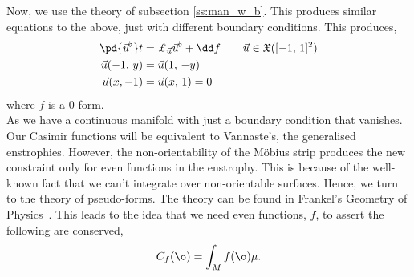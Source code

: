 \noindent
Now, we use the theory of subsection \ref{ss:man_w_b}. This produces similar equations to the above, just with different boundary conditions. This produces,
\begin{equation}
  \begin{split}
    \pd {\vec u^\flat} t &= \pounds_{\vec u} \vec u^\flat + \dd f \qquad \vec u \in \mathfrak{X}([-1,\,1]^2)\\
    \vec u(-1,\,y) &= \vec u(1,\, -y) \\
    \vec u(x,-1) &= \vec u(x,\,1) = 0
  \end{split}
\end{equation}
where $f$ is a $0$-form.\\

\noindent
As we have a continuous manifold with just a boundary condition that vanishes. Our Casimir functions will be equivalent to Vannaste's, the generalised enstrophies. However, the non-orientability of the M\"obius strip produces the new constraint only for even functions in the enstrophy. This is because of the well-known fact that we can't integrate over non-orientable surfaces. Hence, we turn to the theory of pseudo-forms. The theory can be found in Frankel's Geometry of Physics~\cite{frankel}. This leads to the idea that we need even functions, $f$, to assert the following are conserved,
$$ C_f(\o) = \int_M f(\o)\mu. $$